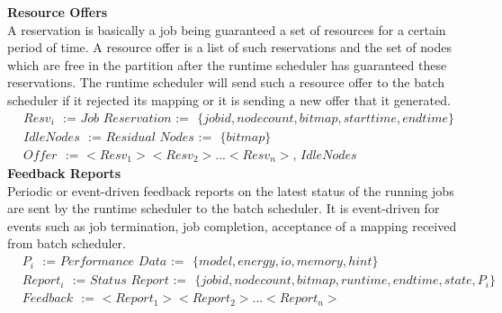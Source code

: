 \textbf{Resource Offers}\\
A reservation is basically a job being guaranteed a set of resources for a certain period of time. A resource offer is a list of such reservations and the set of nodes which are free in the partition after the runtime scheduler has guaranteed these reservations. The runtime scheduler will send such a resource offer to the batch scheduler if it rejected its mapping or it is sending a new offer that it generated.\\
\begin{equation*}
\begin{aligned}
&Resv_{i}\ \ \ \textit{:=\ \ \ Job Reservation\ \ \ :=}\ \ \ \{jobid,node count,bitmap,start time,end time\}\\
&IdleNodes\ \ \ \textit{:=\ \ \ Residual Nodes\ \ \ :=}\ \ \ \{bitmap\}\\
&Offer\ \ \ \textit{:=\ \ \ $<Resv_{1}><Resv_{2}>...<Resv_{n}>$,\ IdleNodes}
\end{aligned}
\end{equation*}
\textbf{Feedback Reports}\\
Periodic or event-driven feedback reports on the latest status of the running jobs are sent by the runtime scheduler to the batch scheduler. It is event-driven for events such as job termination, job completion, acceptance of a mapping received from batch scheduler.
\begin{equation*}
\begin{aligned}
&P_{i}\ \ \ \textit{:=\ \ \ Performance Data\ \ \ :=}\ \ \ \{model,energy,io,memory,hint\}\\
&Report_{i}\ \ \ \textit{:=\ \ \ Status Report\ \ \ :=}\ \ \ \{jobid,node count,bitmap,run time,end time,state,P_{i}\}\\
&Feedback\ \ \ \textit{:=\ \ \ $<Report_{1}><Report_{2}>...<Report_{n}>$}
\end{aligned}
\end{equation*}
